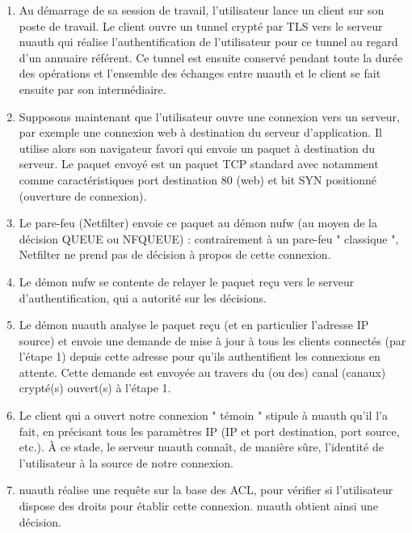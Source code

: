 \documentclass[12pt]{report}
\begin{document}
\begin{itemize}
\begin{enumerate}
  \item Au démarrage de sa session de travail, l’utilisateur lance un client sur son poste de travail. Le client ouvre un tunnel crypté par TLS vers le serveur nuauth qui réalise l’authentification de l’utilisateur pour ce tunnel au regard d’un annuaire référent. Ce tunnel est ensuite conservé pendant toute la durée des opérations et l’ensemble des échanges entre nuauth et le client se fait ensuite par son intermédiaire.
  \\
  \item Supposons maintenant que l’utilisateur ouvre une connexion vers un serveur, par exemple une connexion web à destination du serveur d’application. Il utilise alors son navigateur favori qui envoie un paquet à destination du serveur. Le paquet envoyé est un paquet TCP standard avec notamment comme caractéristiques port destination 80 (web) et bit SYN positionné (ouverture de connexion).
  \\
  \item Le pare-feu (Netfilter) envoie ce paquet au démon nufw (au moyen de la décision QUEUE ou NFQUEUE) : contrairement à un pare-feu " classique ", Netfilter ne prend pas de décision à propos de cette connexion.
  \\
  \item Le démon nufw se contente de relayer le paquet reçu vers le serveur d’authentification, qui a autorité sur les décisions.
  \\
  \item Le démon nuauth analyse le paquet reçu (et en particulier l’adresse IP source) et envoie une demande de mise à jour à tous les clients connectés (par l’étape 1) depuis cette adresse pour qu’ils authentifient les connexions en attente. Cette demande est envoyée au travers du (ou des) canal (canaux) crypté(s) ouvert(s) à l’étape 1.
  \\
  \item Le client qui a ouvert notre connexion " témoin " stipule à nuauth qu’il l’a fait, en précisant tous les paramètres IP (IP et port destination, port source, etc.). À ce stade, le serveur nuauth connaît, de manière sûre, l’identité de l’utilisateur à la source de notre connexion.
  \\
  \item nuauth réalise une requête sur la base des ACL, pour vérifier si l’utilisateur dispose des droits pour établir cette connexion. nuauth obtient ainsi une décision.
  \\

\end{enumerate}
\end{itemize}
\end{document}
